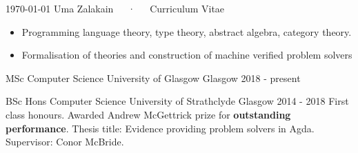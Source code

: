 \documentclass[11pt, a4paper]{awesome-cv}
\begin{document}
\makecvheader

\makecvfooter
  {\today}
  {Uma Zalakain~~~·~~~Curriculum Vitae}
  {\thepage}




\begin{itemize}[noitemsep,wide=0pt]
    \item {Programming language theory, type theory, abstract algebra, category
        theory.}
    \item {Formalisation of theories and construction of machine verified
        problem solvers}
\end{itemize}


\begin{cventries}
    \cventry
      {MSc Computer Science} %
      {University of Glasgow} %
      {Glasgow} %
      {2018 - present} %
      {}

    \cventry
      {BSc Hons Computer Science} %
      {University of Strathclyde} %
      {Glasgow} %
      {2014 - 2018} %
      {
          First class honours. Awarded Andrew McGettrick prize for
          \textbf{outstanding performance}.\newline
          Thesis title: Evidence providing problem solvers in Agda.\newline
          Supervisor: Conor McBride.
      }
\end{cventries}

\end{document}
